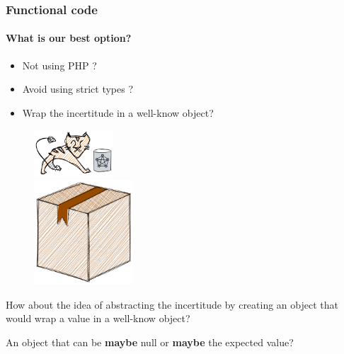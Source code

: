 \begin{frame}
    \frametitle{Functional code}
    \framesubtitle{What is our best option?}

    \begin{itemize}[<+->]
        \item Not using PHP ?
        \item Avoid using strict types ?
        \item Wrap the incertitude in a well-know object?
    \end{itemize}
\end{frame}

\begin{frame}
    \begin{figure}
        \begin{overprint}
            \begin{center}
                \includegraphics[width=8em]{src/session/functional/resources/cat.png}
            \end{center}
            \begin{center}
                \includegraphics[width=10em]{src/session/functional/resources/box.png}
            \end{center}
        \end{overprint}
    \end{figure}

    \pause
    \pause

    How about the idea of abstracting the incertitude by creating an object that
    would wrap a value in a well-know object?\\

    \pause

    \vspace{1em}
    An object that can be \textbf{maybe} null or \textbf{maybe} the expected
    value?
\end{frame}

